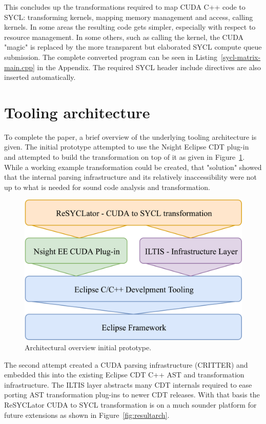 \documentclass[sigconf]{acmart}
\newcommand{\nsight}{Nsight\texttrademark{}}
\begin{document}
This concludes up the transformations required to map CUDA C++ code to SYCL: transforming kernels, mapping memory management and access, calling kernels. In some areas the resulting code gets simpler, especially with respect to resource management. In some others, such as calling the kernel, the CUDA "magic" is replaced by the more transparent but elaborated SYCL compute queue submission. The complete converted program can be seen in Listing~\ref{sycl-matrix-main.cpp} in the Appendix. The required SYCL header include directives are also inserted automatically.

\section{Tooling architecture}
To complete the paper, a brief overview of the underlying tooling architecture is given. The initial prototype attempted to use the \nsight{} Eclipse CDT plug-in and attempted to build the transformation on top of it as given in Figure~\ref{fig:protoarch}. While a working example transformation could be created, that "solution" showed that the internal parsing infrastructure and its relatively inaccessibility were not up to what is needed for sound code analysis and transformation. 
\begin{figure}[h]
  \centering
  \includegraphics[width=\linewidth]{SimpleArchitectureNsight}
  \caption{Architectural overview initial prototype.}
  \label{fig:protoarch}
\end{figure}

The second attempt created a CUDA parsing infrastructure (CRITTER) and embedded this into the existing Eclipse CDT C++ AST and transformation infrastructure\cite{stauberCRITTER2019}. The ILTIS layer \cite{stauberIltis2018} abstracts many CDT internals required to ease porting AST transformation plug-ins to newer CDT releases. With that basis the ReSYCLator CUDA to SYCL transformation is on a much sounder platform for future extensions as shown in Figure~\ref{fig:resultarch}.
\end{document}
